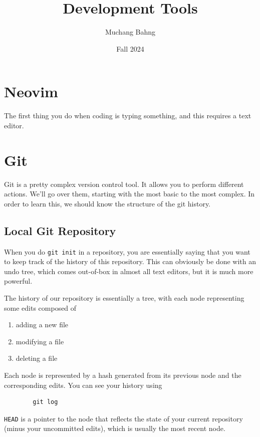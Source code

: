 \documentclass{article}
\begin{document}
\title{Development Tools}
\author{Muchang Bahng}
\date{Fall 2024}

\maketitle
\tableofcontents
\pagebreak

\section{Neovim} 

  The first thing you do when coding is typing something, and this requires a text editor. 

\section{Git} 

    Git is a pretty complex version control tool. It allows you to perform different actions. We'll go over them, starting with the most basic to the most complex. In order to learn this, we should know the structure of the git history. 

  \subsection{Local Git Repository} 

    When you do \texttt{git init} in a repository, you are essentially saying that you want to keep track of the history of this repository. This can obviously be done with an undo tree, which comes out-of-box in almost all text editors, but it is much more powerful. 

    \begin{definition}
      The history of our repository is essentially a tree, with each node representing some edits composed of 
      \begin{enumerate}
        \item adding a new file 
        \item modifying a file 
        \item deleting a file
      \end{enumerate} 
      Each node is represented by a hash generated from its previous node and the corresponding edits. You can see your history using  
      \begin{lstlisting}
        git log 
      \end{lstlisting} 
      \texttt{HEAD} is a pointer to the node that reflects the state of your current repository (minus your uncommitted edits), which is usually the most recent node. 
    \end{definition} 
\end{document}
